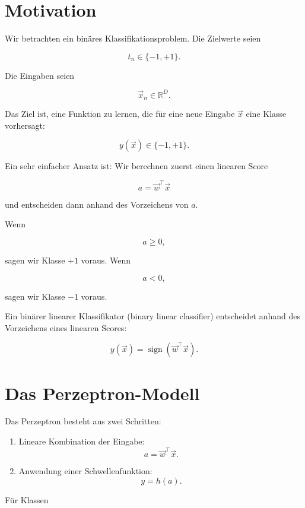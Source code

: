 \section{Motivation}

Wir betrachten ein binäres Klassifikationsproblem.
Die Zielwerte seien

\[
    t_n \in \{-1,+1\}.
\]

Die Eingaben seien

\[
    \vec{x}_n \in \mathbb{R}^D.
\]

Das Ziel ist, eine Funktion zu lernen, die für eine neue Eingabe \(\vec{x}\) eine Klasse vorhersagt:

\[
    y(\vec{x})
    \in
    \{-1,+1\}.
\]

Ein sehr einfacher Ansatz ist:
Wir berechnen zuerst einen linearen Score

\[
    a
    =
    \vec{w}^{\top}\vec{x}
\]

und entscheiden dann anhand des Vorzeichens von \(a\).

Wenn

\[
    a \geq 0,
\]

sagen wir Klasse \(+1\) voraus.
Wenn

\[
    a < 0,
\]

sagen wir Klasse \(-1\) voraus.

\begin{definitionbox}
Ein binärer linearer Klassifikator (binary linear classifier) entscheidet anhand des Vorzeichens eines linearen Scores:

\[
    y(\vec{x})
    =
    \operatorname{sign}(\vec{w}^{\top}\vec{x}).
\]
\end{definitionbox}

\section{Das Perzeptron-Modell}

Das Perzeptron besteht aus zwei Schritten:

\begin{enumerate}
    \item Lineare Kombination der Eingabe:
    \[
        a
        =
        \vec{w}^{\top}\vec{x}.
    \]

    \item Anwendung einer Schwellenfunktion:
    \[
        y
        =
        h(a).
    \]
\end{enumerate}

Für Klassen

